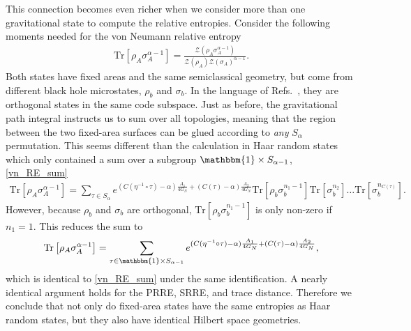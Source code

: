 \documentclass[a4paper,11pt]{article}
\newcommand{\Tr}{\text{Tr}}
\newcommand*{\JKF}[1]{\textcolor{blue}{[JKF: #1]}}
\newcommand*{\SR}[1]{\textcolor{magenta}{[SR: \textsf{#1}]}}
\begin{document}
This connection becomes even richer when we consider more than one gravitational state to compute the relative entropies. Consider the following moments needed for the von Neumann relative entropy
\begin{align}
    \Tr \left[ \rho_A \sigma_A^{\alpha-1} \right]= \frac{\mathcal{Z}(\rho_A \sigma_A^{\alpha-1})}{\mathcal{Z}(\rho_A)\mathcal{Z}(\sigma_A)^{\alpha-1}}.
\end{align}
Both states have fixed areas and the same semiclassical geometry, but come from different black hole microstates, $\rho_b$ and $\sigma_b$. In the language of Refs.~\cite{2015JHEP...04..163A,2017CMaPh.354..865H}, they are orthogonal states in the same code subspace. 
Just as before, the gravitational path integral instructs us to sum over all topologies, meaning that the region between the two fixed-area surfaces can be glued according to \textit{any} $S_{\alpha}$ permutation. This seems different than the calculation in Haar random states which only contained a sum over a subgroup $\mathbbm{1} \times S_{\alpha -1}$, \eqref{vn_RE_sum}
\begin{align}
    \Tr \left[ \rho_A \sigma_A^{\alpha-1} \right]= \sum_{\tau \in  S_{\alpha}}{e^{(C(\eta^{-1} \circ \tau)-\alpha) \frac{A_1}{4G_N} + \left(C(\tau)-\alpha\right) \frac{A_2}{4G_N}}}\Tr\left[\rho_b \sigma_b^{n_1-1}\right]\Tr\left[\sigma_b^{n_2}\right]\dots\Tr\left[\sigma_b^{n_{C(\tau)}}\right].
\end{align}
However, because $\rho_b$ and $\sigma_b$ are orthogonal, $\Tr\left[\rho_b \sigma_b^{n_1-1}\right]$ is only non-zero if $n_1 = 1$. This reduces the sum to 
\begin{align}
    \Tr \left[ \rho_A \sigma_A^{\alpha-1} \right]= \sum_{\tau \in  \mathbbm{1}\times S_{\alpha-1}}{e^{(C(\eta^{-1} \circ \tau)-\alpha) \frac{A_1}{4G_N} + \left(C(\tau)-\alpha\right) \frac{A_2}{4G_N}}},
\end{align}
which is identical to \eqref{vn_RE_sum} under the same identification. A nearly identical argument holds for the PRRE, SRRE, and trace distance. Therefore we conclude that not only do fixed-area states have the same entropies as Haar random states, but they also have identical Hilbert space geometries.
\end{document}
